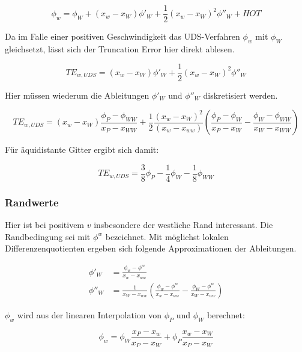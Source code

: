 \documentclass[11pt, ngerman,colorback,accentcolor=tud2d]{tudreport}
\begin{document}
\begin{equation*}
  \phi_w = \phi_W +(x_w-x_W) \phi'_W + \frac{1}{2} (x_w-x_W)^2 \phi''_W+HOT
\end{equation*}

Da im Falle einer positiven Geschwindigkeit das UDS-Verfahren $\phi_w$ mit $\phi_W$
gleichsetzt, lässt sich der Truncation Error hier direkt ablesen.

\begin{equation*}
  TE_{w, UDS} = (x_w-x_W) \phi'_W + \frac{1}{2} (x_w-x_W)^2 \phi''_W
\end{equation*}

Hier müssen wiederum die Ableitungen $\phi'_W$ und $\phi''_W$ diskretisiert werden.

\begin{equation}
  TE_{w, UDS} = (x_w-x_W) \frac{\phi_P-\phi_{WW}}{x_P-x_{WW}}+
  \frac{1}{2} \frac{(x_w-x_W)^2}{(x_w-x_{ww})} \left({\frac{\phi_P-\phi_W}{x_P-x_W}
  - \frac{\phi_W-\phi_{WW}}{x_W-x_{WW}} }\right)
\end{equation}

Für äquidistante Gitter ergibt sich damit:

\begin{equation}
  TE_{w, UDS} = \frac{3}{8} \phi_P-\frac{1}{4} \phi_W - \frac{1}{8} \phi_{WW}
\end{equation}


\subsubsection{Randwerte}

Hier ist bei positivem $v$ insbesondere der westliche Rand interessant. Die
Randbedingung sei mit $\phi^w$ bezeichnet. Mit möglichst lokalen Differenzenquotienten
ergeben sich folgende Approximationen der Ableitungen.

\begin{align*}
  \phi'_W &= \frac{\phi_w-\phi^w}{x_w-x_{ww}}\\
  \phi''_W &= \frac{1}{x_W-x_{ww}} \left({\frac{\phi_w-\phi^w}{x_w-x_{ww}}
- \frac{\phi_W-\phi^w}{x_W-x_{ww}} }\right)
\end{align*}

$\phi_w$ wird aus der linearen Interpolation von $\phi_P$ und $\phi_W$ berechnet:

\begin{equation*}
  \phi_w = \phi_W \frac{x_P-x_w}{x_P-x_W} + \phi_P \frac{x_w-x_W}{x_P-x_W}
\end{equation*}
\end{document}
